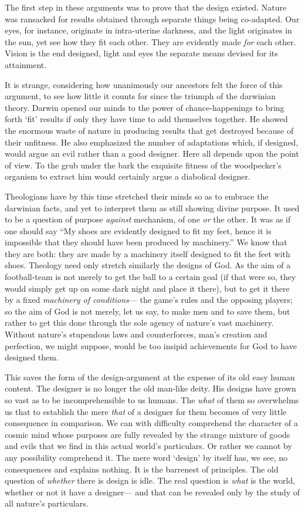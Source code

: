 \documentclass[]{article}
\begin{document}
The first step in these arguments was to prove that the design existed. Nature was ransacked for results obtained through separate things being co-adapted. Our eyes, for instance, originate in intra-uterine darkness, and the light originates in the sun, yet see how they fit each other. They are evidently made \emph{for} each other. Vision is the end designed, light and eyes the separate means devised for its attainment.

It is strange, considering how unanimously our ancestors felt the force of this argument, to see how little it counts for since the triumph of the darwinian theory. Darwin opened our minds to the power of chance-happenings to bring forth `fit' results if only they have time to add themselves together. He showed the enormous waste of nature in producing results that get destroyed because of their unfitness. He also emphasized the number of adaptations which, if designed, would argue an evil rather than a good designer. Here all depends upon the point of view. To the grub under the bark the exquisite fitness of the woodpecker's organism to extract him would certainly argue a diabolical designer.

Theologians have by this time stretched their minds so as to embrace the darwinian facts, and yet to interpret them as still showing divine purpose. It used to be a question of purpose \emph{against} mechanism, of one \emph{or} the other. It was as if one should say ``My shoes are evidently designed to fit my feet, hence it is impossible that they should have been produced by machinery.'' We know that they are both: they are made by a machinery itself designed to fit the feet with shoes. Theology need only stretch similarly the designs of God. As the aim of a football-team is not merely to get the ball to a certain goal (if that were so, they would simply get up on some dark night and place it there), but to get it there by a fixed \emph{machinery of conditions}--- the game's rules and the opposing players; so the aim of God is not merely, let us say, to make men and to save them, but rather to get this done through the sole agency of nature's vast machinery. Without nature's stupendous laws and counterforces, man's creation and perfection, we might suppose, would be too insipid achievements for God to have designed them.

This saves the form of the design-argument at the expense of its old easy human content. The designer is no longer the old man-like deity. His designs have grown so vast as to be incomprehensible to us humans. The \emph{what} of them so overwhelms us that to establish the mere \emph{that} of a designer for them becomes of very little consequence in comparison. We can with difficulty comprehend the character of a cosmic mind whose purposes are fully revealed by the strange mixture of goods and evils that we find in this actual world's particulars. Or rather we cannot by any possibility comprehend it. The mere word `design' by itself has, we see, no consequences and explains nothing. It is the barrenest of principles. The old question of \emph{whether} there is design is idle. The real question is \emph{what} is the world, whether or not it have a designer--- and that can be revealed only by the study of all nature's particulars.
\end{document}
